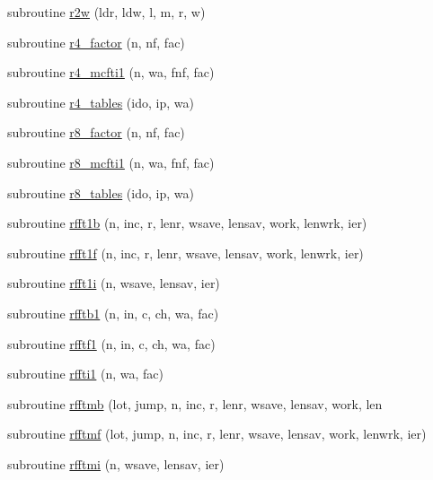 \begin{DoxyCompactItemize}
\item 
subroutine \mbox{\hyperlink{namespacefftclass_a6d2b5609d651241869584e962d234756}{r2w}} (ldr, ldw, l, m, r, w)
\item 
subroutine \mbox{\hyperlink{namespacefftclass_ad76d163c3f3aec3b5a3bbb3285498ffd}{r4\+\_\+factor}} (n, nf, fac)
\item 
subroutine \mbox{\hyperlink{namespacefftclass_aecf4238ff306578dd37cab143ce6efac}{r4\+\_\+mcfti1}} (n, wa, fnf, fac)
\item 
subroutine \mbox{\hyperlink{namespacefftclass_a882cd8d6eeb407d2b10ee9b3d9fee8b9}{r4\+\_\+tables}} (ido, ip, wa)
\item 
subroutine \mbox{\hyperlink{namespacefftclass_a22bddf5efe99e8dcd5737d2d73ae832f}{r8\+\_\+factor}} (n, nf, fac)
\item 
subroutine \mbox{\hyperlink{namespacefftclass_a89d64713ecbaec08b4d5180fcbc56cea}{r8\+\_\+mcfti1}} (n, wa, fnf, fac)
\item 
subroutine \mbox{\hyperlink{namespacefftclass_a68ac2e6dba058989d5e0d7fbee9aa19f}{r8\+\_\+tables}} (ido, ip, wa)
\item 
subroutine \mbox{\hyperlink{namespacefftclass_a2bdd31e65a4abb79ed9e0eeaa71cee6b}{rfft1b}} (n, inc, r, lenr, wsave, lensav, work, lenwrk, ier)
\item 
subroutine \mbox{\hyperlink{namespacefftclass_ad5aa2059236e01ea65aecda114c3f45f}{rfft1f}} (n, inc, r, lenr, wsave, lensav, work, lenwrk, ier)
\item 
subroutine \mbox{\hyperlink{namespacefftclass_abb3d8b6f0166090db98de3e7d627434f}{rfft1i}} (n, wsave, lensav, ier)
\item 
subroutine \mbox{\hyperlink{namespacefftclass_a338a7a4db13f2357c42a682142df3190}{rfftb1}} (n, in, c, ch, wa, fac)
\item 
subroutine \mbox{\hyperlink{namespacefftclass_af9f24f143ca02395c91f7757343e8003}{rfftf1}} (n, in, c, ch, wa, fac)
\item 
subroutine \mbox{\hyperlink{namespacefftclass_a122822a405cd96e5df936acaad731746}{rffti1}} (n, wa, fac)
\item 
subroutine \mbox{\hyperlink{namespacefftclass_acc4295c5a3646519e26c3dd5ae66418d}{rfftmb}} (lot, jump, n, inc, r, lenr, wsave, lensav, work, len
\item 
subroutine \mbox{\hyperlink{namespacefftclass_a4662111bc784aa321b0567a1a0578963}{rfftmf}} (lot, jump, n, inc, r, lenr, wsave, lensav, work, lenwrk, ier)
\item 
subroutine \mbox{\hyperlink{namespacefftclass_a6a543283f910322f94293d719f923881}{rfftmi}} (n, wsave, lensav, ier)

\end{DoxyCompactItemize}
